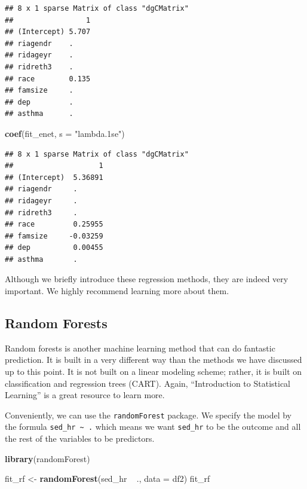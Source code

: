 \documentclass[]{tufte-book}
\newenvironment{Shaded}{}{}
\newcommand{\KeywordTok}[1]{\textcolor[rgb]{0.00,0.44,0.13}{\textbf{#1}}}
\newcommand{\DataTypeTok}[1]{\textcolor[rgb]{0.56,0.13,0.00}{#1}}
\newcommand{\StringTok}[1]{\textcolor[rgb]{0.25,0.44,0.63}{#1}}
\newcommand{\OperatorTok}[1]{\textcolor[rgb]{0.40,0.40,0.40}{#1}}
\newcommand{\NormalTok}[1]{#1}
\theoremstyle{definition}
\theoremstyle{definition}
\theoremstyle{remark}
\begin{document}
\begin{verbatim}
## 8 x 1 sparse Matrix of class "dgCMatrix"
##                 1
## (Intercept) 5.707
## riagendr    .    
## ridageyr    .    
## ridreth3    .    
## race        0.135
## famsize     .    
## dep         .    
## asthma      .
\end{verbatim}

\begin{Shaded}
\begin{Highlighting}[]
\KeywordTok{coef}\NormalTok{(fit_enet, }\DataTypeTok{s =} \StringTok{"lambda.1se"}\NormalTok{)}
\end{Highlighting}
\end{Shaded}

\begin{verbatim}
## 8 x 1 sparse Matrix of class "dgCMatrix"
##                    1
## (Intercept)  5.36891
## riagendr     .      
## ridageyr     .      
## ridreth3     .      
## race         0.25955
## famsize     -0.03259
## dep          0.00455
## asthma       .
\end{verbatim}

Although we briefly introduce these regression methods, they are indeed
very important. We highly recommend learning more about them.

\subsection*{Random Forests}\label{random-forests}

Random forests is another machine learning method that can do fantastic
prediction. It is built in a very different way than the methods we have
discussed up to this point. It is not built on a linear modeling scheme;
rather, it is built on classification and regression trees (CART).
Again, ``Introduction to Statistical Learning'' is a great resource to
learn more.

Conveniently, we can use the \texttt{randomForest} package. We specify
the model by the formula \texttt{sed\_hr\ \textasciitilde{}\ .} which
means we want \texttt{sed\_hr} to be the outcome and all the rest of the
variables to be predictors.

\begin{Shaded}
\begin{Highlighting}[]
\KeywordTok{library}\NormalTok{(randomForest)}

\NormalTok{fit_rf <-}\StringTok{ }\KeywordTok{randomForest}\NormalTok{(sed_hr }\OperatorTok{~}\StringTok{ }\NormalTok{., }\DataTypeTok{data =}\NormalTok{ df2)}
\NormalTok{fit_rf}
\end{Highlighting}
\end{Shaded}
\end{document}
